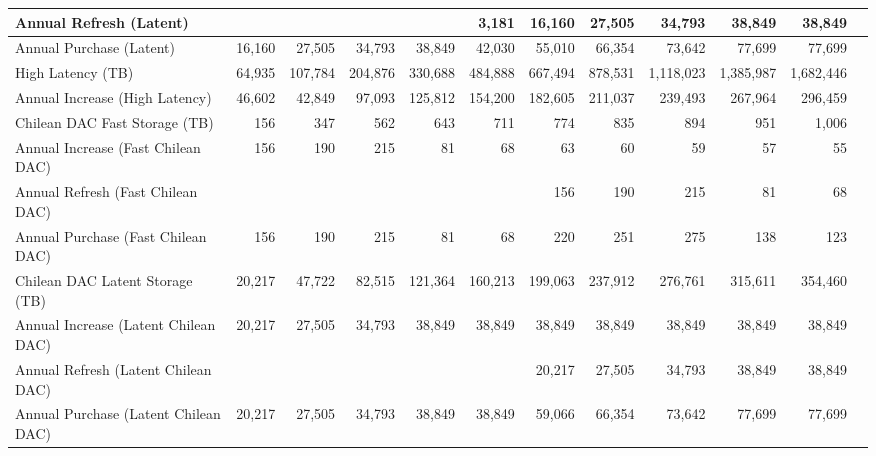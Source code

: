 \begin{longtable} { |p{}  |r  |r  |r  |r  |r  |r  |r  |r  |r  |r  |r |}
{Annual Refresh (Latent)}&{}&{}&{}&{}&{3,181}&{16,160}&{27,505}&{34,793}&{38,849}&{38,849} \\ \hline
{Annual Purchase (Latent)}&{16,160}&{27,505}&{34,793}&{38,849}&{42,030}&{55,010}&{66,354}&{73,642}&{77,699}&{77,699} \\ \hline
{High Latency (TB)}&{64,935}&{107,784}&{204,876}&{330,688}&{484,888}&{667,494}&{878,531}&{1,118,023}&{1,385,987}&{1,682,446} \\ \hline
{Annual Increase (High Latency)}&{46,602}&{42,849}&{97,093}&{125,812}&{154,200}&{182,605}&{211,037}&{239,493}&{267,964}&{296,459} \\ \hline
{Chilean DAC Fast Storage (TB)}&{156}&{347}&{562}&{643}&{711}&{774}&{835}&{894}&{951}&{1,006} \\ \hline
{Annual Increase (Fast Chilean DAC)}&{156}&{190}&{215}&{81}&{68}&{63}&{60}&{59}&{57}&{55} \\ \hline
{Annual Refresh (Fast Chilean DAC)}&{}&{}&{}&{}&{}&{156}&{190}&{215}&{81}&{68} \\ \hline
{Annual Purchase (Fast Chilean DAC)}&{156}&{190}&{215}&{81}&{68}&{220}&{251}&{275}&{138}&{123} \\ \hline
{Chilean DAC Latent Storage (TB)}&{20,217}&{47,722}&{82,515}&{121,364}&{160,213}&{199,063}&{237,912}&{276,761}&{315,611}&{354,460} \\ \hline
{Annual Increase (Latent Chilean DAC)}&{20,217}&{27,505}&{34,793}&{38,849}&{38,849}&{38,849}&{38,849}&{38,849}&{38,849}&{38,849} \\ \hline
{Annual Refresh (Latent Chilean DAC)}&{}&{}&{}&{}&{}&{20,217}&{27,505}&{34,793}&{38,849}&{38,849} \\ \hline
{Annual Purchase (Latent Chilean DAC)}&{20,217}&{27,505}&{34,793}&{38,849}&{38,849}&{59,066}&{66,354}&{73,642}&{77,699}&{77,699} \\ \hline
\end{longtable} \normalsize
